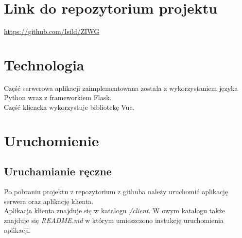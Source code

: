 \documentclass[12pt,a4paper]{article} %
\begin{document}
\section{Link do repozytorium projektu}
    \url{https://github.com/Isild/ZIWG}

\section{Technologia}
    Część serwerowa aplikacji zaimplementowana została z wykorzystaniem języka Python wraz z frameworkiem Flask.\\
    Część kliencka wykorzystuje bibliotekę Vue.

\section{Uruchomienie}

    \subsection{Uruchamianie ręczne}
        Po pobraniu projektu z repozytorium z githuba należy uruchomić aplikację serwera oraz aplikację klienta.\\
        Aplikacja klienta znajduje się w katalogu \textit{/client}. W owym katalogu także znajduje się \textit{README.md} w którym umieszczono instukcję uruchomienia aplikacji.\\
        
\end{document}
